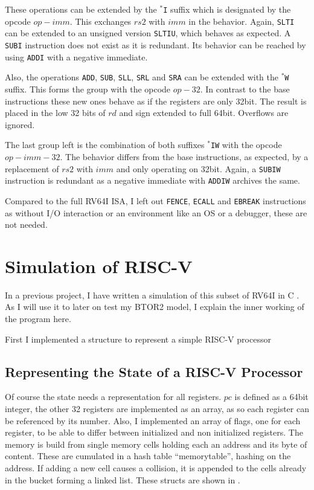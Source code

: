 These operations can be extended by the \texttt{$^*$I} suffix which
is designated by the opcode $op-imm$. This exchanges $rs2$ with $imm$
in the behavior. Again, \texttt{SLTI} can be extended to an unsigned
version \texttt{SLTIU}, which behaves as expected. A \texttt{SUBI}
instruction does not exist as it is redundant. Its behavior can be
reached by using \texttt{ADDI} with a negative immediate.

Also, the operations \texttt{ADD}, \texttt{SUB}, \texttt{SLL},
\texttt{SRL} and \texttt{SRA} can be extended with the \texttt{$^*$W}
suffix. This forms the group with the opcode $op-32$. In contrast to
the base instructions these new ones behave as if the registers are
only 32bit. The result is placed in the low 32 bits of $rd$ and sign
extended to full 64bit. Overflows are ignored.

The last group left is the combination of both suffixes
\texttt{$^*$IW} with the opcode $op-imm-32$. The behavior differs
from the base instructions, as expected, by a replacement of $rs2$
with $imm$ and only operating on 32bit. Again, a \texttt{SUBIW}
instruction is redundant as a negative immediate with \texttt{ADDIW}
archives the same.

Compared to the full RV64I ISA, I left out \texttt{FENCE},
\texttt{ECALL} and \texttt{EBREAK} instructions as without I/O
interaction or an environment like an OS or a debugger, these are not
needed.

\section{Simulation of RISC-V}\label{sec:simulation}
In a previous project, I have written a simulation of this subset of
RV64I in C \cite{repoSim}. As I will use it to later on test my BTOR2
model, I explain the inner working of the program here.

First I implemented a structure to represent a simple RISC-V
processor

\subsection{Representing the State of a RISC-V Processor}
Of course the state needs a representation for all registers. $pc$ is
defined as a 64bit integer, the other 32 registers are implemented as
an array, as so each register can be referenced by its number. Also,
I implemented an array of flags, one for each register, to be able to
differ between initialized and non initialized registers. The memory
is build from single memory cells holding each an address and its
byte of content. These are cumulated in a hash table
\enquote{memorytable}, hashing on the address. If adding a new cell
causes a collision, it is appended to the cells already in the bucket
forming a linked list. These structs are shown in
.

